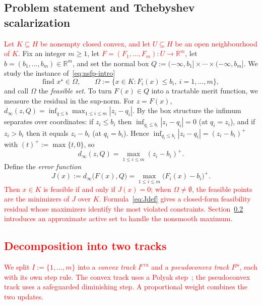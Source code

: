 \documentclass[]{interact}
\theoremstyle{plain}
\theoremstyle{definition}
\theoremstyle{remark}
\newcommand{\R}{\mathbb{R}}
\newcommand{\abs}[1]{\left\lvert #1 \right\rvert}
\newcommand{\cvx}{\mathrm{cvx}}
\newcommand{\ps}{\mathrm{ps}}
\begin{document}
\subsection{Problem statement and Tchebyshev scalarization}\label{ssec:model-stmt}
\leavevmode\textcolor{red}{Let $K\subseteq H$ be nonempty closed convex, and let $U\subseteq H$ be an open
neighbourhood of $K$}. Fix an integer $m\ge1$, let \leavevmode\textcolor{red}{$F=(F_1,\dots,F_m):U\to\R^m$},
let $b=(b_1,\dots,b_m)\in\R^m$, and set the normal box
$Q:=(-\infty,b_1]\times\cdots\times(-\infty,b_m]$. We study the instance
of~\eqref{eq:nsfp-intro}
\begin{equation}\label{eq:nsfp-box}
\text{find } x^\star\in\Omega,\qquad
\Omega:=\bigl\{x\in K: F_i(x)\le b_i,\ i=1,\dots,m\bigr\},
\end{equation}
and call $\Omega$ the \emph{feasible set}. To turn $F(x)\in Q$ into a tractable merit
function, we measure the residual in the sup-norm. For $z=F(x)$,
$d_\infty(z,Q)=\inf_{q\le b}\max_{1\le i\le m}\abs{z_i-q_i}$. By the box structure the
infimum separates over coordinates: if $z_i\le b_i$ then
$\inf_{q_i\le b_i}\abs{z_i-q_i}=0$ (at $q_i=z_i$), and if $z_i>b_i$ then it equals
$z_i-b_i$ (at $q_i=b_i$). Hence $\inf_{q_i\le b_i}\abs{z_i-q_i}=(z_i-b_i)^+$ with
$(t)^+:=\max\{t,0\}$, so
\begin{equation}\label{eq:dinfty}
d_\infty(z,Q)=\max_{1\le i\le m}(z_i-b_i)^+ .
\end{equation}
Define the \emph{error function}
\begin{equation}\label{eq:Jdef}
J(x):=d_\infty\bigl(F(x),Q\bigr)=\max_{1\le i\le m}\bigl(F_i(x)-b_i\bigr)^+ .
\end{equation}
\leavevmode\textcolor{red}{Then $x\in K$ is feasible if and only if $J(x)=0$; when $\Omega\ne\emptyset$, the feasible
points are the minimizers of $J$ over $K$. Formula~\eqref{eq:Jdef} gives a closed-form feasibility residual whose
maximizers identify the most violated constraints. Section~\ref{ssec:dual-track}
introduces an approximate active set to handle the nonsmooth maximum.}

\subsection{\textcolor{red}{Decomposition into two tracks}}\label{ssec:dual-track}
\leavevmode\textcolor{red}{We split $I:=\{1,\dots,m\}$ into a \emph{convex track} $I^{\cvx}$ and a
\emph{pseudoconvex track} $I^{\ps}$, each with its own step rule. The convex track uses a Polyak step~\citep{polyak1969};
the pseudoconvex track uses a safeguarded diminishing step.
A proportional weight combines the two updates.}
\end{document}
